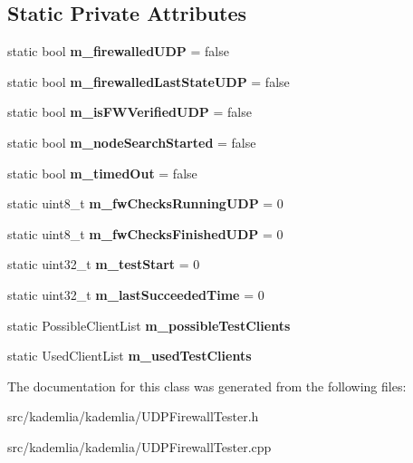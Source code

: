 \subsection*{Static Private Attributes}
\begin{DoxyCompactItemize}
\item 
static bool {\bfseries m\_\-firewalledUDP} = false\label{classKademlia_1_1CUDPFirewallTester_afb422fa004332eb6e60b1675f5483a82}

\item 
static bool {\bfseries m\_\-firewalledLastStateUDP} = false\label{classKademlia_1_1CUDPFirewallTester_ade35eb09c77954623e716735b300dace}

\item 
static bool {\bfseries m\_\-isFWVerifiedUDP} = false\label{classKademlia_1_1CUDPFirewallTester_a7091338b7f91b2b729bffcedb156e4c7}

\item 
static bool {\bfseries m\_\-nodeSearchStarted} = false\label{classKademlia_1_1CUDPFirewallTester_abb96c1db6eb91eb9a53bfa726b63cc92}

\item 
static bool {\bfseries m\_\-timedOut} = false\label{classKademlia_1_1CUDPFirewallTester_a65ae459b5a06f476ad79a4fb5cc2270c}

\item 
static uint8\_\-t {\bfseries m\_\-fwChecksRunningUDP} = 0\label{classKademlia_1_1CUDPFirewallTester_a4d2dc5dc69a79a6a60abb4b01f103bd9}

\item 
static uint8\_\-t {\bfseries m\_\-fwChecksFinishedUDP} = 0\label{classKademlia_1_1CUDPFirewallTester_a68b5a7f4132d63fad9e4ed7ed4d8fb4e}

\item 
static uint32\_\-t {\bfseries m\_\-testStart} = 0\label{classKademlia_1_1CUDPFirewallTester_aeeb9a16fb1e7fa2df168e6883c4fc002}

\item 
static uint32\_\-t {\bfseries m\_\-lastSucceededTime} = 0\label{classKademlia_1_1CUDPFirewallTester_a11440fe44500e21f6acdd125a1680ae6}

\item 
static PossibleClientList {\bfseries m\_\-possibleTestClients}\label{classKademlia_1_1CUDPFirewallTester_a8f15c2851f2cd59220e3b367c813be5a}

\item 
static UsedClientList {\bfseries m\_\-usedTestClients}\label{classKademlia_1_1CUDPFirewallTester_a6c53b9328b8352f853c0ea3d655665fe}

\end{DoxyCompactItemize}


The documentation for this class was generated from the following files:\begin{DoxyCompactItemize}
\item 
src/kademlia/kademlia/UDPFirewallTester.h\item 
src/kademlia/kademlia/UDPFirewallTester.cpp\end{DoxyCompactItemize}
